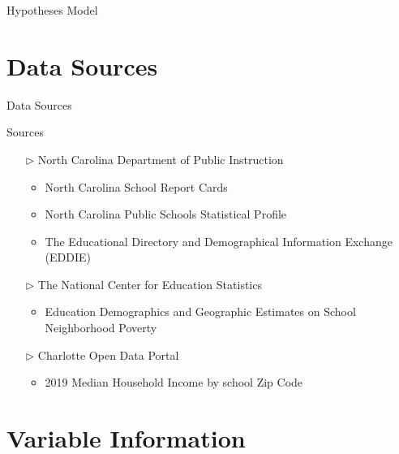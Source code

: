\documentclass[10pt]{beamer}
\begin{document}
\begin{frame}[fragile]{Hypotheses Model}


\end{frame}


\section[Data Sources]{Data Sources}

\begin{frame}{Data Sources}
    \fontsize{11pt}{7.2}
    \begin{exampleblock}{Sources}
        \begin{itemize}
            \setlength\itemsep{3mm}
            \item[$\triangleright$] North Carolina Department of Public Instruction
                \begin{itemize}
                    \item North Carolina School Report Cards
                    \item North Carolina Public Schools Statistical Profile
                    \item The Educational Directory and Demographical Information Exchange (EDDIE)
                \end{itemize}
            \item[$\triangleright$] The National Center for Education Statistics 
                \begin{itemize}
                    \item Education Demographics and Geographic Estimates on School Neighborhood Poverty
                \end{itemize}
            \item[$\triangleright$] Charlotte Open Data Portal
                \begin{itemize}
                    \item 2019 Median Household Income by school Zip Code
                \end{itemize}
        \end{itemize}
    \end{exampleblock}

\end{frame}


\section[Variable Information]{Variable Information}
\end{document}
